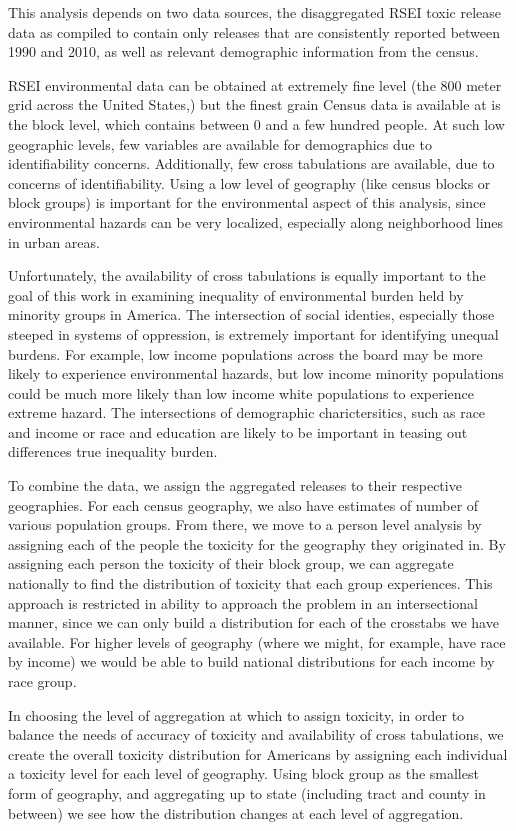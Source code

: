 \documentclass[12pt,twoside]{dukestatscithesis}
\theoremstyle{definition}
\theoremstyle{definition}
\theoremstyle{definition}
\theoremstyle{remark}
\begin{document}
This analysis depends on two data sources, the disaggregated RSEI toxic
release data as compiled to contain only releases that are consistently
reported between 1990 and 2010, as well as relevant demographic
information from the census.

RSEI environmental data can be obtained at extremely fine level (the 800
meter grid across the United States,) but the finest grain Census data
is available at is the block level, which contains between 0 and a few
hundred people. At such low geographic levels, few variables are
available for demographics due to identifiability concerns.
Additionally, few cross tabulations are available, due to concerns of
identifiability. Using a low level of geography (like census blocks or
block groups) is important for the environmental aspect of this
analysis, since environmental hazards can be very localized, especially
along neighborhood lines in urban areas.

Unfortunately, the availability of cross tabulations is equally
important to the goal of this work in examining inequality of
environmental burden held by minority groups in America. The
intersection of social identies, especially those steeped in systems of
oppression, is extremely important for identifying unequal burdens. For
example, low income populations across the board may be more likely to
experience environmental hazards, but low income minority populations
could be much more likely than low income white populations to
experience extreme hazard. The intersections of demographic
charictersitics, such as race and income or race and education are
likely to be important in teasing out differences true inequality
burden.

To combine the data, we assign the aggregated releases to their
respective geographies. For each census geography, we also have
estimates of number of various population groups. From there, we move to
a person level analysis by assigning each of the people the toxicity for
the geography they originated in. By assigning each person the toxicity
of their block group, we can aggregate nationally to find the
distribution of toxicity that each group experiences. This approach is
restricted in ability to approach the problem in an intersectional
manner, since we can only build a distribution for each of the crosstabs
we have available. For higher levels of geography (where we might, for
example, have race by income) we would be able to build national
distributions for each income by race group.

In choosing the level of aggregation at which to assign toxicity, in
order to balance the needs of accuracy of toxicity and availability of
cross tabulations, we create the overall toxicity distribution for
Americans by assigning each individual a toxicity level for each level
of geography. Using block group as the smallest form of geography, and
aggregating up to state (including tract and county in between) we see
how the distribution changes at each level of aggregation.
\end{document}
